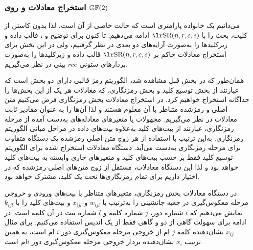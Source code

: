 \subsubsection*{استخراج معادلات 		و  روی $\mathbb{GF}(2)$}
می‌دانیم  
یک خانواده پارامتری است که 
حالت خاصی از آن است،  لذا بدون کاستن از کلیت، بحث را با 
$\text{\en{SR}}(n,r,c,e)$
ادامه می‌دهیم. تا کنون برای توضیح 
و 
، 
قالب داده و زیرکلیدها را به‌صورت آرایه‌های دو بعدی در نظر گرفتیم، ولی ‌در این بخش برای  استخراج معادلات حاکم بر 
$\text{\en{SR}}(n,r,c,e)$
 قالب داده و زیرکلید‌ها را به‌صورت بردار‌های ستونی
 $rce$
 بیتی در نظر می‌گیریم. 

همان‌طور که در بخش قبل مشاهده شد، الگوریتم رمز قالبی 
دارای دو بخش است که عبارتند از بخش توسیع کلید و بخش رمزنگاری، که معادلات هر یک از این بخش‌ها را جداگانه استخراج خواهیم کرد.  در استخراج معادلات بخش رمزنگاری فرض می‌کنیم متن اصلی و رمزشده متناظر با آن معلوم هستند و لذا آن‌ها را به عنوان مقادیر ثابت معادلات در نظر می‌گیریم. مجهولات یا متغیرهای معادله‌های به‌دست آمده از مرحله رمزنگاری، عبارتند از بیت‌های کلید به‌علاوه بیت‌های داده در مراحل میانی الگوریتم رمزنگاری. به‌این ترتیب با استفاده از هر زوج متن اصلی-رمزشده یک دستگاه متفاوت برای مرحله رمزنگاری به‌دست می‌آید. دستگاه معادلات استخراج شده برای الگوریتم توسیع کلید فقط بر حسب بیت‌های کلید و متغیرهای جاری وابسته به بیت‌های کلید خواهد بود و لذا این دستگاه معادلات، مستقل از زوج متن‌های اصلی-رمزشده که در اختیار داریم برای تمام رمزنگاری‌ها تحت یک کلید، مشترک خواهد بود. 

در دستگاه معادلات بخش رمزنگاری،  متغیرهای متناظر با بیت‌های ورودی و خروجی مرحله معکوس‌گیری در جعبه جانشینی را به‌ترتیب با 
$w_{ijl}$
و 
$x_{ijl}$
و بیت‌های کلید را با 
$k_{ijl}$
نمایش می‌دهیم که 
$i$
شماره دور، 
$j$
شماره کلمه و 
$l$
شماره بیت در آن کلمه است. در ادامه  برای سهولت گاهی از دو و گاهی فقط از یک اندیس استفاده می‌کنیم. برای مثال 
$x_{ij}$
نشان‌دهنده کلمه 
$j$
 ام از خروجی مرحله معکوس‌گیری  دور 
 $i$
 ام است، به همین ترتیب 
 $x_{i}$
 نشان‌دهنده بردار خروجی مرحله معکوس‌گیری دور 
 $i$ام
است. 

